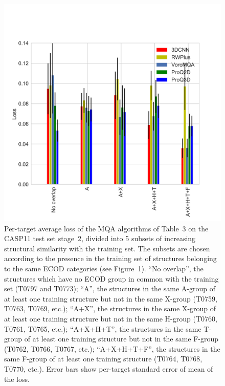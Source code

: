\documentclass[letter,10pt]{article}
\begin{document}
\begin{figure}[H]
    \centering
    \includegraphics[width=\linewidth]{Fig/LossVsECOD.png}
%
    \caption{Per-target average loss of the MQA algorithms of Table~3
    on the CASP11 test set stage~2, divided into 5 subsets of
    increasing structural similarity with the training set. The
    subsets are chosen according to the presence in the training set
    of structures belonging to the same ECOD categories (see Figure~1). 
%
    ``No overlap'', the structures which have no ECOD group in common
    with the training set (T0797 and T0773);
%
    ``A'', the structures in the same A-group of at least one training
    structure but not in the same X-group (T0759, T0763, T0769, etc.); 
%
    ``A+X'', the structures in the same X-group of at least one training
    structure but not in the same H-group (T0760, T0761, T0765, etc.);
%
    ``A+X+H+T'', the structures in the same T-group of at least one
    training structure but not in the same F-group (T0762, T0766, T0767,
    etc.);
%
    ``A+X+H+T+F'', the structures in the same F-group of at least one
    training structure (T0764, T0768, T0770, etc.).
%
    Error bars show per-target standard error of mean of the loss.}
%
    \label{Fig:LossVsECOD}
\end{figure}
\end{document}
